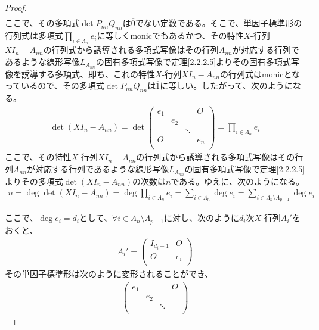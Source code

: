 \documentclass[dvipdfmx]{jsarticle}
\begin{document}
\begin{proof}
\begin{align*}
\end{align*}
ここで、その多項式$\det{P_{nn}Q_{nn}}$は$\overline{0}$でない定数である。そこで、単因子標準形の行列式は多項式$\prod_{i \in \varLambda_{n}} e_{i}$に等しくmonicでもあるかつ、その特性$X$-行列$XI_{n} - A_{nn}$の行列式から誘導される多項式写像はその行列$A_{nn}$が対応する行列であるような線形写像$L_{A_{nn}}$の固有多項式写像で定理\ref{2.2.2.5}よりその固有多項式写像を誘導する多項式、即ち、これの特性$X$-行列$XI_{n} - A_{nn}$の行列式はmonicとなっているので、その多項式$\det{P_{nn}Q_{nn}}$は$\overline{1}$に等しい。したがって、次のようになる。
\begin{align*}
\det\left( XI_{n} - A_{nn} \right) = \det\begin{pmatrix}
e_{1} & \  & \  & O \\
\  & e_{2} & \  & \  \\
\  & \  & \ddots & \  \\
O & \  & \  & e_{n} \\
\end{pmatrix} = \prod_{i \in \varLambda_{n}} e_{i}
\end{align*}
ここで、その特性$X$-行列$XI_{n} - A_{nn}$の行列式から誘導される多項式写像はその行列$A_{nn}$が対応する行列であるような線形写像$L_{A_{nn}}$の固有多項式写像で定理\ref{2.2.2.5}よりその多項式$\det\left( XI_{n} - A_{nn} \right)$の次数は$n$である。ゆえに、次のようになる。
\begin{align*}
n = \deg{\det\left( XI_{n} - A_{nn} \right)} = \deg{\prod_{i \in \varLambda_{n}} e_{i}} = \sum_{i \in \varLambda_{n}} {\deg e_{i}} = \sum_{i \in \varLambda_{n} \setminus \varLambda_{p - 1}} {\deg e_{i}}
\end{align*}\par
ここで、$\deg e_{i} = d_{i}$として、$\forall i \in \varLambda_{n} \setminus \varLambda_{p - 1}$に対し、次のように$d_{i}$次$X$-行列$A_{i}'$をおくと、
\begin{align*}
A_{i}' = \begin{pmatrix}
I_{d_{i} - 1} & O \\
O & e_{i} \\
\end{pmatrix}
\end{align*}
その単因子標準形は次のように変形されることができ、
\begin{align*}
\begin{pmatrix}
e_{1} & \  & \  & O \\
\  & e_{2} & \  & \  \\
\  & \  & \ddots & \  \\

\end{pmatrix}
\end{align*}
\end{proof}
\end{document}
